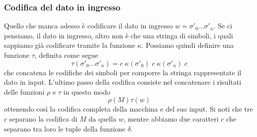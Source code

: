 \subsubsection{Codifica del dato in ingresso}
Quello che manca adesso è codificare il dato in ingresso
$w = \sigma'_0 \dots \sigma'_n$. Se ci pensiamo, il dato in
ingresso, altro non è che una stringa di simboli, i quali
sappiamo già codificare tramite la funzione $\kappa$. Possiamo
quindi definire una funzione $\tau$, definita come segue
\[
	\tau(\sigma'_0 \dots \sigma'_n) =
	c \; \kappa(\sigma'_0) \;
	c \; \kappa(\sigma'_n) \; c
\]
che concatena le codifiche dei simboli per comporre la stringa
rappresentate il dato in input. L'ultimo passo della codifica
consiste nel concatenare i risultati delle funzioni $\rho$ e
$\tau$ in questo modo
\[ \rho(M) \tau(w) \]
ottenendo così la codifica completa della macchina e del suo
input. Si noti che tre $c$ separano la codifica di $M$ da quella
$w$, mentre abbiamo due caratteri $c$ che separano tra loro le
tuple della funzione $\delta$.
